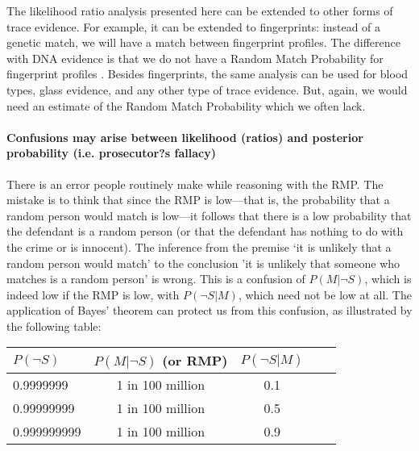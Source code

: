\documentclass[10pt]{article}
\begin{document}
The likelihood ratio analysis presented here can be extended to other forms of trace evidence. For example, it can 
be extended to fingerprints: instead of a genetic match, we will have a match 
between fingerprint profiles. The difference with DNA evidence is that we do not have a 
Random Match Probability for fingerprint profiles \citep{Zabell2005Fingerprint-Evi}. Besides fingerprints, the same 
analysis can be used for blood types, glass evidence, and any other type of trace evidence. 
But, again, we would need an estimate of the Random Match Probability 
which we often lack. 


\paragraph{Confusions may arise between likelihood (ratios) and posterior probability (i.e. prosecutor?s fallacy)}
There is an error people routinely make while reasoning with the RMP. The mistake is to think that since the RMP is low---that is, the probability that a random person would match is low---it follows that there is a low probability that the defendant is a random person (or that the defendant has nothing to do with the crime or is innocent).
The inference from the premise `it is unlikely that a random person would match' to 
the conclusion 'it is unlikely that someone who matches is a random person' is wrong. 
This is a confusion of $P(M |\neg S)$, which is indeed low if the RMP is low, with $P(\neg S | M)$, 
which need not be low at all. The application of Bayes' theorem can protect us from this confusion, as illustrated by the following table: 

\vspace{2mm}
\hspace{0.5cm}
\begin{centering}
\begin{tabular}{lcccc}
\hline
$P(\neg S)$ &  $P(M | \neg S)$ (or RMP) &   $P(\neg S | M)$ \\
\hline
0.9999999 & 1 in 100 million & 0.1  \\
0.99999999 & 1 in 100 million & 0.5  \\
0.999999999 & 1 in 100 million  & 0.9  \\
\hline
\end{tabular}
\end{centering}
\vspace{2mm}
\end{document}
